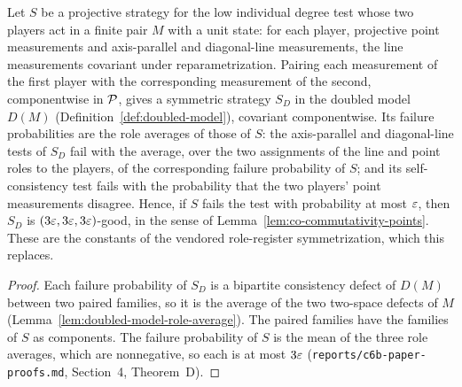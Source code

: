 \begin{theorem}
\label{thm:doubled-symmetrization}
\leanok
Let $S$ be a projective strategy for the low individual degree test whose two players act in a
finite pair $M$ with a unit state: for each player, projective point measurements and
axis-parallel and diagonal-line measurements, the line measurements covariant under
reparametrization. Pairing each measurement of the first player with the corresponding measurement
of the second, componentwise in $\cal{P}$, gives a symmetric strategy $S_D$ in the doubled model
$D(M)$ (Definition~\ref{def:doubled-model}), covariant componentwise. Its failure probabilities
are the role averages of those of $S$: the axis-parallel and diagonal-line tests of $S_D$ fail
with the average, over the two assignments of the line and point roles to the players, of the
corresponding failure probability of $S$; and its self-consistency test fails with the probability
that the two players' point measurements disagree. Hence, if $S$ fails the test with probability at
most $\eps$, then $S_D$ is $(3\eps, 3\eps, 3\eps)$-good, in the sense of
Lemma~\ref{lem:co-commutativity-points}. These are the constants of the vendored role-register
symmetrization, which this replaces.
\end{theorem}

\begin{proof}
\leanok
Each failure probability of $S_D$ is a bipartite consistency defect of $D(M)$ between two paired
families, so it is the average of the two two-space defects of $M$
(Lemma~\ref{lem:doubled-model-role-average}). The paired families have the families of $S$ as
components. The failure probability of $S$ is the mean of the three role averages, which are
nonnegative, so each is at most $3\eps$ (\texttt{reports/c6b-paper-proofs.md}, Section~4,
Theorem~D).
\end{proof}

